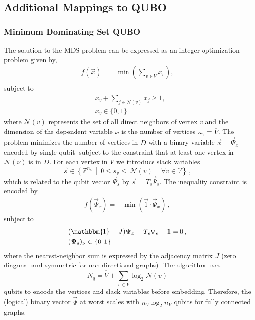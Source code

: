 \documentclass[prd,twocolumn,tightenlines,preprintnumbers,showpacs,superscriptaddress,notitlepage,nofootinbib,eqsecnum,floatfix,longbibliography,aps,10pt]{revtex4-1}
\begin{document}
\subsection{Additional Mappings to QUBO}
\label{sec:methods:ILP-to-QUBO}
\subsubsection{Minimum Dominating Set QUBO}
\label{sec:methods:mds-qubo}

The solution to the MDS problem can be expressed as an integer optimization problem given by,
\begin{align}
 f(\vec x) = & \min\left(\sum_{v \in V} x_v\right),                    \\
\end{align}
subject to
\begin{align}
 & x_v + \sum_{j \in \mathcal{N}(v)} x_j \geq 1, \\
 & x_v \in \{0, 1\}
\end{align}
where $\mathcal{N}(v)$ represents the set of all direct neighbors of vertex $v$ and the dimension of the dependent variable $x$ is the number of vertices $n_V \equiv \overline{\overline{V}}$.
The problem minimizes the number of vertices in $D$ with a binary variable $\vec x = \vec \Psi_x$ encoded by single qubit, subject to the constraint that at least one vertex in $\mathcal{N}(\nu)$ is in $D$.
For each vertex in $V$ we introduce slack variables
\begin{equation}
    \vec s \in \left\{ \mathbb{Z}^{n_V} \, \middle| \, 0 \leq s_{v} \leq |\mathcal{N}(v)| \quad \forall v\in V \right\} \, ,
\end{equation}
which is related to the qubit vector $\vec \Psi_s$ by $\vec s = T_s \vec \Psi_s$.
The inequality constraint is encoded by
\begin{align}
 f(\vec \Psi_x)
 =
 & \min\left(\vec 1 \cdot \vec \Psi_x \right) \, ,
\end{align}
subject to
\begin{align}
 &
 (\mathbbm{1} + J)\vec \Psi_x - T_s \Psi_s  - \vec 1 = 0\,,
 \\
 &
 (\vec \Psi_s)_\nu \in \{ 0, 1\}
\end{align}
where the nearest-neighbor sum is expressed by the adjacency matrix $J$ (zero diagonal and symmetric for non-directional graphs).
The algorithm uses
\begin{equation}
    N_q = \overline{\overline{V}} + \sum_{v \in V} \log_2 \mathcal{N}(v)
\end{equation}
qubits to encode the vertices and slack variables before embedding.
Therefore, the (logical) binary vector $\vec \Psi$ at worst scales with $n_V \log_2 n_V$ qubits for fully connected graphs.
\end{document}
